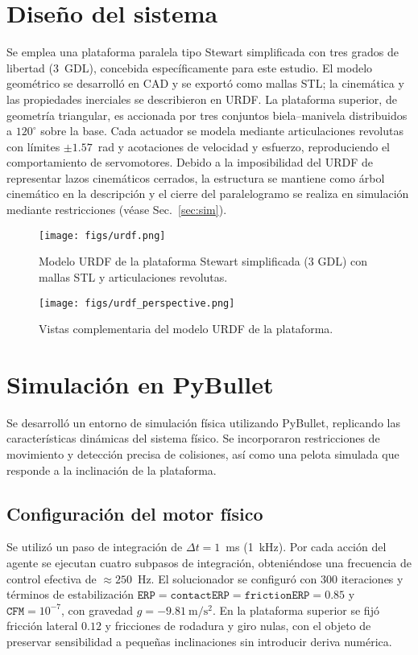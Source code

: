 \documentclass[conference]{IEEEtran}
\begin{document}
\section{Diseño del sistema}
Se emplea una plataforma paralela tipo Stewart simplificada con tres grados de libertad (3~GDL), concebida específicamente para este estudio. El modelo geométrico se desarrolló en CAD y se exportó como mallas STL; la cinemática y las propiedades inerciales se describieron en URDF. La plataforma superior, de geometría triangular, es accionada por tres conjuntos biela–manivela distribuidos a $120^\circ$ sobre la base. Cada actuador se modela mediante articulaciones revolutas con límites $\pm 1.57$~rad y acotaciones de velocidad y esfuerzo, reproduciendo el comportamiento de servomotores. Debido a la imposibilidad del URDF de representar lazos cinemáticos cerrados, la estructura se mantiene como árbol cinemático en la descripción y el cierre del paralelogramo se realiza en simulación mediante restricciones (véase Sec.~\ref{sec:sim}).

\begin{figure}[th]
    \centering
    \texttt{[image: figs/urdf.png]} %
    \caption{Modelo URDF de la plataforma Stewart simplificada (3 GDL) con mallas STL y articulaciones revolutas.}
    \label{fig:urdf}
\end{figure}
\begin{figure}[th]
    \centering
    \texttt{[image: figs/urdf\_perspective.png]} %
    \caption{Vistas complementaria del modelo URDF de la plataforma.}
    \label{fig:urdf-perspective}
\end{figure}


\section{Simulación en PyBullet}
Se desarrolló un entorno de simulación física utilizando PyBullet, replicando las características dinámicas del sistema físico. Se incorporaron restricciones de movimiento y detección precisa de colisiones, así como una pelota simulada que responde a la inclinación de la plataforma.

\subsection{Configuración del motor físico}
Se utilizó un paso de integración de $\Delta t=1$~ms (1~kHz). Por cada acción del agente se ejecutan cuatro subpasos de integración, obteniéndose una frecuencia de control efectiva de $\approx 250$~Hz. El solucionador se configuró con 300 iteraciones y términos de estabilización $\texttt{ERP}=\texttt{contactERP}=\texttt{frictionERP}=0.85$ y $\texttt{CFM}=10^{-7}$, con gravedad $g=-9{.}81~\mathrm{m/s^2}$. En la plataforma superior se fijó fricción lateral $0.12$ y fricciones de rodadura y giro nulas, con el objeto de preservar sensibilidad a pequeñas inclinaciones sin introducir deriva numérica.
\end{document}
